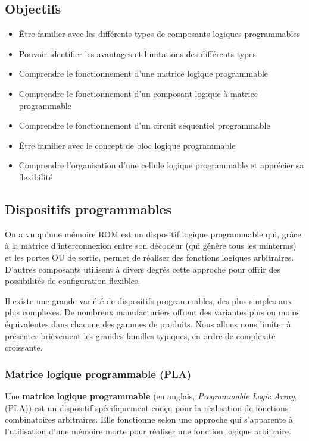 \documentclass[11pt]{article}
\begin{document}
\subsection{Objectifs}
\label{sec:org37879fd}
\begin{itemize}
\item Être familier avec les différents types de composants logiques programmables
\item Pouvoir identifier les avantages et limitations des différents types
\item Comprendre le fonctionnement d'une matrice logique programmable
\item Comprendre le fonctionnement d'un composant logique à matrice programmable
\item Comprendre le fonctionnement d'un circuit séquentiel programmable
\item Être familier avec le concept de bloc logique programmable
\item Comprendre l'organisation d'une cellule logique programmable et
apprécier sa flexibilité
\end{itemize}

\subsection{Dispositifs programmables}
\label{sec:org82eeae0}

On a vu qu'une mémoire ROM est un dispositif logique programmable qui,
grâce à la matrice d'interconnexion entre son décodeur (qui génère
tous les minterms) et les portes OU de sortie, permet de réaliser des
fonctions logiques arbitraires. D'autres composants utilisent à divers
degrés cette approche pour offrir des possibilités de configuration
flexibles.

Il existe une grande variété de dispositifs programmables, des plus
simples aux plus complexes. De nombreux manufacturiers offrent des
variantes plus ou moins équivalentes dans chacune des gammes de
produits. Nous allons nous limiter à présenter brièvement les grandes
familles typiques, en ordre de complexité croissante.

\subsubsection{Matrice logique programmable (PLA)}
\label{sec:org2722232}

Une \textbf{matrice logique programmable} (en anglais, \emph{Programmable Logic
Array}, (PLA)) est un dispositif spécifiquement conçu pour la
réalisation de fonctions combinatoires arbitraires. Elle fonctionne
selon une approche qui s'apparente à l'utilisation d'une mémoire morte
pour réaliser une fonction logique arbitraire.
\end{document}
